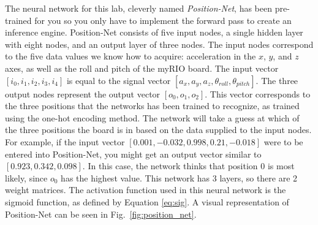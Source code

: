 \documentclass{article}
\begin{document}
The neural network for this lab, cleverly named \textit{Position-Net}, has been pre-trained for you so you only have to implement the forward pass to create an inference engine. Position-Net consists of five input nodes, a single hidden layer with eight nodes, and an output layer of three nodes. The input nodes correspond to the five data values we know how to acquire: acceleration in the $x$, $y$, and $z$ axes, as well as the roll and pitch of the myRIO board. The input vector $[i_0, i_1, i_2, i_3, i_4]$ is equal to the signal vector $[a_x, a_y, a_z, \theta_{roll}, \theta_{pitch}]$. The three output nodes represent the output vector $[o_0, o_1, o_2]$. This vector corresponds to the three positions that the networks has been trained to recognize, as trained using the one-hot encoding method. The network will take a guess at which of the three positions the board is in based on the data supplied to the input nodes. For example, if the input vector $[0.001, -0.032, 0.998, 0.21, -0.018]$ were to be entered into Position-Net, you might get an output vector similar to $[0.923, 0.342, 0.098]$. In this case, the network thinks that position 0 is most likely, since $o_0$ has the highest value.  This network has 3 layers, so there are 2 weight matrices.  The activation function used in this neural network is the sigmoid function, as defined by Equation \ref{eq:sig}. A visual representation of Position-Net can be seen in Fig.~\ref{fig:position_net}.
\end{document}
